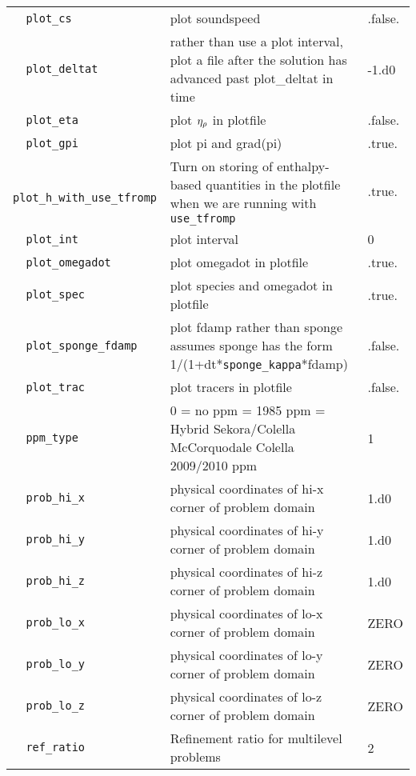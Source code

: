 \begin{landscape}
{\begin{center}
\begin{longtable}{|l|p{5.25in}|l|}
\verb=  plot_cs  = &   plot soundspeed  &  .false. \\
\rowcolor{tableShade}
\verb=  plot_deltat  = &   rather than use a plot interval, plot a file after the solution has advanced past plot\_deltat in time  &  -1.d0 \\
\verb=  plot_eta  = &   plot $\eta_{\rho}$ in plotfile  &  .false. \\
\rowcolor{tableShade}
\verb=  plot_gpi  = &   plot pi and grad(pi)  &  .true. \\
\verb=  plot_h_with_use_tfromp  = &   Turn on storing of enthalpy-based quantities in the plotfile when we are running with {\tt use\_tfromp}  &  .true. \\
\rowcolor{tableShade}
\verb=  plot_int  = &   plot interval  &  0 \\
\verb=  plot_omegadot  = &   plot omegadot in plotfile  &  .true. \\
\rowcolor{tableShade}
\verb=  plot_spec  = &   plot species and omegadot in plotfile  &  .true. \\
\verb=  plot_sponge_fdamp  = &   plot fdamp rather than sponge assumes sponge has the form 1/(1+dt*{\tt sponge\_kappa}*fdamp)  &  .false. \\
\rowcolor{tableShade}
\verb=  plot_trac  = &   plot tracers in plotfile  &  .false. \\
\verb=  ppm_type  = &   0 = no ppm \newline 1 = 1985 ppm \newline 2 = Hybrid Sekora/Colella McCorquodale Colella 2009/2010 ppm  &  1 \\
\rowcolor{tableShade}
\verb=  prob_hi_x  = &   physical coordinates of hi-x corner of problem domain  &  1.d0 \\
\verb=  prob_hi_y  = &   physical coordinates of hi-y corner of problem domain  &  1.d0 \\
\rowcolor{tableShade}
\verb=  prob_hi_z  = &   physical coordinates of hi-z corner of problem domain  &  1.d0 \\
\verb=  prob_lo_x  = &   physical coordinates of lo-x corner of problem domain  &  ZERO \\
\rowcolor{tableShade}
\verb=  prob_lo_y  = &   physical coordinates of lo-y corner of problem domain  &  ZERO \\
\verb=  prob_lo_z  = &   physical coordinates of lo-z corner of problem domain  &  ZERO \\
\rowcolor{tableShade}
\verb=  ref_ratio  = &   Refinement ratio for multilevel problems  &  2 \\

\end{longtable}
\end{center}}
\end{landscape}
